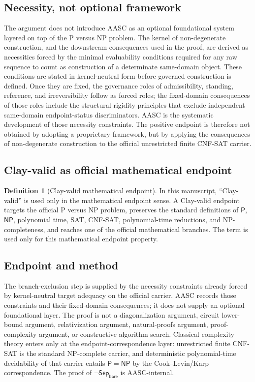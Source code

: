 \documentclass[11pt]{article}
\theoremstyle{definition}
\newtheorem{definition}[theorem]{Definition}
\theoremstyle{remark}
\newcommand{\SepBare}{\mathsf{Sep}_{\mathsf{bare}}}
\newcommand{\Pclass}{\mathsf{P}}
\newcommand{\NPclass}{\mathsf{NP}}
\begin{document}
\subsection{Necessity, not optional framework}
The argument does not introduce AASC as an optional foundational system layered on top of the P versus NP problem. The kernel of non-degenerate construction, and the downstream consequences used in the proof, are derived as necessities forced by the minimal evaluability conditions required for any raw sequence to count as construction of a determinate same-domain object. These conditions are stated in kernel-neutral form before governed construction is defined. Once they are fixed, the governance roles of admissibility, standing, reference, and irreversibility follow as forced roles; the fixed-domain consequences of those roles include the structural rigidity principles that exclude independent same-domain endpoint-status discriminators. AASC is the systematic development of those necessity constraints. The positive endpoint is therefore not obtained by adopting a proprietary framework, but by applying the consequences of non-degenerate construction to the official unrestricted finite CNF-SAT carrier.

\subsection{Clay-valid as official mathematical endpoint}

\begin{definition}[Clay-valid mathematical endpoint]\label{def:clay-valid-math-endpoint}
In this manuscript, ``Clay-valid'' is used only in the mathematical endpoint sense. A Clay-valid endpoint targets the official P versus NP problem, preserves the standard definitions of \(\Pclass\), \(\NPclass\), polynomial time, SAT, CNF-SAT, polynomial-time reductions, and NP-completeness, and reaches one of the official mathematical branches. The term is used only for this mathematical endpoint property.
\end{definition}

\subsection{Endpoint and method}
The branch-exclusion step is supplied by the necessity constraints already forced by kernel-neutral target adequacy on the official carrier. AASC records those constraints and their fixed-domain consequences; it does not supply an optional foundational layer. The proof is not a diagonalization argument, circuit lower-bound argument, relativization argument, natural-proofs argument, proof-complexity argument, or constructive algorithm search. Classical complexity theory enters only at the endpoint-correspondence layer: unrestricted finite CNF-SAT is the standard NP-complete carrier, and deterministic polynomial-time decidability of that carrier entails \(\Pclass=\NPclass\) by the Cook--Levin/Karp correspondence. The proof of \(\neg\SepBare\) is AASC-internal.
\end{document}
